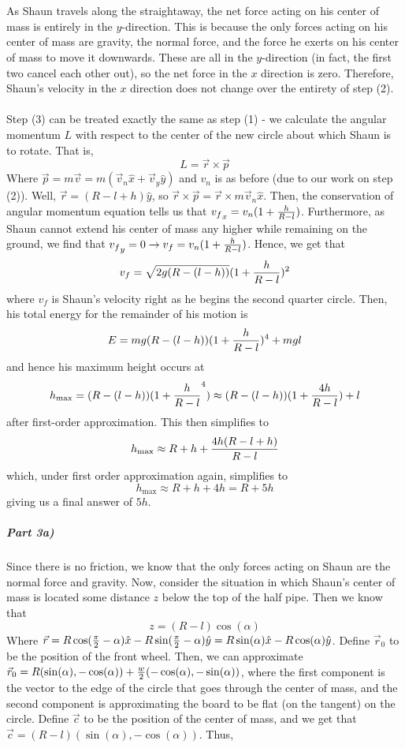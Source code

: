 \\\\ As Shaun travels along the straightaway, the net force acting on his center of mass is entirely in the $y$-direction.  This is because the only forces acting on his center of mass are gravity, the normal force, and the force he exerts on his center of mass to move it downwards.  These are all in the $y$-direction (in fact, the first two cancel each other out), so the net force in the $x$ direction is zero.  Therefore, Shaun's velocity in the $x$ direction does not change over the entirety of step (2).  
\\\\ Step (3) can be treated exactly the same as step (1) - we calculate the angular momentum $L$ with respect to the center of the new circle about which Shaun is to rotate.  That is, 
$$L=\vec r\times \vec p$$
Where $\vec p=m\vec v=m(\vec v_n \hat x+\vec v_y \hat y)$ and $v_n$ is as before (due to our work on step (2)).  Well, $\vec r=(R-l+h)\hat y$, so $\vec r\times \vec p=\vec r\times m\vec v_n \hat x$.  Then, the conservation of angular momentum equation tells us that ${v_f}_x=v_n (1+\frac{h}{R-l})$.  Furthermore, as Shaun cannot extend his center of mass any higher while remaining on the ground, we find that ${v_f}_y=0\rightarrow v_f=v_n(1+\frac{h}{R-l})$.  Hence, we get that
$$v_f=\sqrt{2g(R-(l-h))}(1+\frac{h}{R-l})^2$$
where $v_f$ is Shaun's velocity right as he begins the second quarter circle.  Then, his total energy for the remainder of his motion is
$$E=mg(R-(l-h)) (1+\frac{h}{R-l})^4+mgl$$
and hence his maximum height occurs at
$$h_{\max}=(R-(l-h))(1+\frac{h}{R-l}^4)\approx (R-(l-h))(1+\frac{4h}{R-l})+l$$
after first-order approximation.  This then simplifies to
$$h_{\max}\approx R+h+\frac{4h(R-l+h)}{R-l}$$
which, under first order approximation again, simplifies to
$$h_{\max}\approx R+h+4h=R+5h$$
giving us a final answer of $5h$.
\subparagraph{Part 3a)}
Since there is no friction, we know that the only forces acting on Shaun are the normal force and gravity. Now, consider the situation in which Shaun's center of mass is located some distance $z$ below the top of the half pipe. Then we know that
$$z=(R-l)\cos(\alpha)$$
Where $\vec r=R\cos(\frac \pi 2-\alpha)\hat x-R\sin(\frac \pi 2-\alpha)\hat y=R\sin(\alpha)\hat x-R\cos(\alpha)\hat y$.  Define $\vec r_0$ to be the position of the front wheel.  Then, we can approximate $\vec r_0=R(\sin(\alpha), -\cos(\alpha))+\frac{w}{2}(-\cos(\alpha), -\sin(\alpha))$, where the first component is the vector to the edge of the circle that goes through the center of mass, and the second component is approximating the board to be flat (on the tangent) on the circle.  Define $\vec c$ to be the position of the center of mass, and we get that $\vec c=(R-l)(\sin(\alpha), -\cos(\alpha))$.  Thus,
